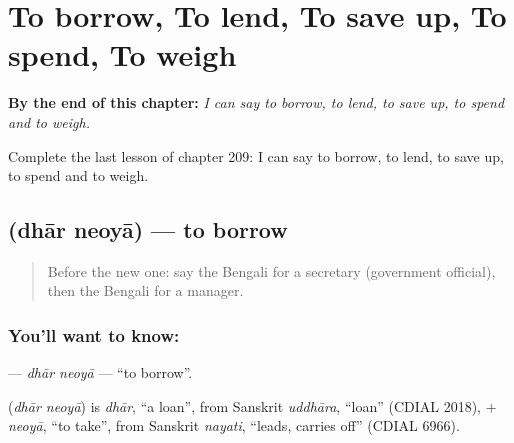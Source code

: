 
\chapter{To borrow, To lend, To save up, To spend, To weigh}
\label{ch:bn-to-borrow-to-lend-to-save-up-to-spend-to-weigh}

\begin{chapteropening}
\textbf{By the end of this chapter:} \emph{I can say to borrow, to lend, to save up, to spend and to weigh.}

Complete the last lesson of chapter 209: I can say to borrow, to lend, to save up, to spend and to weigh.
\end{chapteropening}

\section[\texorpdfstring{\bn{ধার} \bn{নেওয়া} (dhār neoyā)}{ধার নেওয়া (dhār neoyā)}]{  (dhār neoyā) — to borrow}

\label{lesson:BN-C209-dhar-neoya}



\begin{quote}
Before the new one: say the Bengali for a secretary (government official), then the Bengali for a manager.
\end{quote}

\subsection*{You'll want to know:  }
\textbf{ } — \emph{dhār neoyā} — \textquotedblleft{}to borrow\textquotedblright{}.

\begin{cousinweb}
\textbf{ } (\emph{dhār neoyā}) is \emph{dhār}, \textquotedblleft{}a loan\textquotedblright{}, from Sanskrit \emph{uddhāra}, \textquotedblleft{}loan\textquotedblright{} (CDIAL 2018), + \emph{neoyā}, \textquotedblleft{}to take\textquotedblright{}, from Sanskrit \emph{nayati}, \textquotedblleft{}leads, carries off\textquotedblright{} (CDIAL 6966).
\end{cousinweb}

